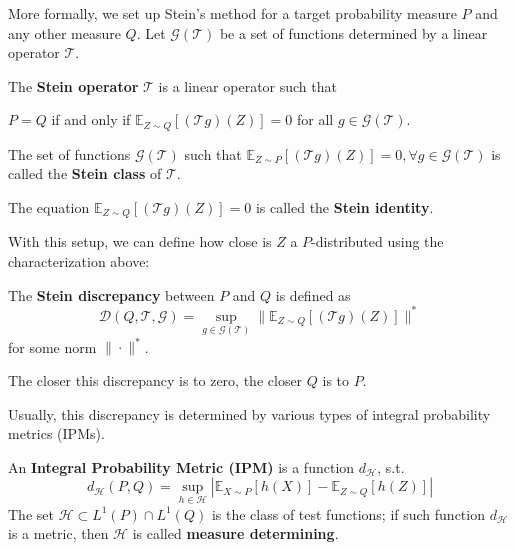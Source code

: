 \documentclass{article}
\begin{document}
More formally, we set up Stein's method for a target probability measure $P$ and any other measure $Q$. Let $\mathcal{G}(\mathcal{T})$ be a set of functions determined by a linear operator $\mathcal{T}$.  

\begin{definition}\label{def:stein_operator}
    The \textbf{Stein operator} $\mathcal{T}$ is a linear operator such that
    \begin{center}
        $P=Q$ if and only if $\mathbb{E}_{Z\sim Q}[(\mathcal{T}g)(Z)]=0$ for all $g \in \mathcal{G}(\mathcal{T})$.
    \end{center}
    The set of functions $\mathcal{G}(\mathcal{T})$ such that $\mathbb{E}_{Z \sim P}[(\mathcal{T}g)(Z)]=0, \forall g \in \mathcal{G}(\mathcal{T})$ is called the \textbf{Stein class} of $\mathcal{T}$.
\end{definition}

The equation $\mathbb{E}_{Z\sim Q}[(\mathcal{T}g)(Z)]=0$ is called the \textbf{Stein identity}.  

With this setup, we can define how close is $Z$ a $P$-distributed using the characterization above:

\begin{definition}
    The \textbf{Stein discrepancy} between $P$ and $Q$ is defined as\label{def:stein_discrepancy}
    \begin{equation*}
        \mathcal{D}(Q, \mathcal{T}, \mathcal{G})=\sup_{g \in \mathcal{G}(\mathcal{T})} \|\mathbb{E}_{Z\sim Q}[(\mathcal{T}g)(Z)]\|^*
    \end{equation*}
    for some norm $\|\cdot\|^*$.
\end{definition}

The closer this discrepancy is to zero, the closer $Q$ is to $P$. 

Usually, this discrepancy is determined by various types of integral probability metrics (IPMs).

\begin{definition}\label{def:ipm}
    An \textbf{Integral Probability Metric (IPM)} is a function $d_{\mathcal{H}}$, s.t. 
    \begin{equation*}
        d_\mathcal{H}(P, Q) = \sup_{h \in \mathcal{H}} |\mathbb{E}_{X\sim P}[h(X)] - \mathbb{E}_{Z\sim Q}[h(Z)]|
    \end{equation*}
    The set $\mathcal{H} \subset L^1(P) \cap L^1(Q)$ is the class of test functions; if such function $d_\mathcal{H}$ is a metric, then $\mathcal{H}$ is called \textbf{measure determining}.
\end{definition}
\end{document}
